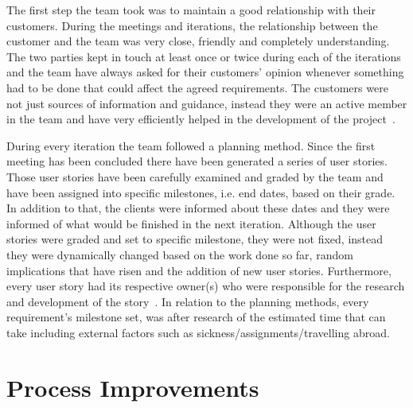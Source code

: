 \documentclass{l3proj}
\begin{document}
The first step the team took was to maintain a good relationship with their customers. During the meetings and iterations, the relationship between the customer and the team was very close, friendly and completely understanding. The two parties kept in touch at least once or twice during each of the iterations and the team have always asked for their customers' opinion whenever something had to be done that could affect the agreed requirements. The customers were not just sources of information and guidance, instead they were an active member in the team and have very efficiently helped in the development of the project~\cite{Customers}.

During every iteration the team followed a planning method. Since the first meeting has been concluded there have been generated a series of user stories. Those user stories have been carefully examined and graded by the team and have been assigned into specific milestones, i.e. end dates, based on their grade. In addition to that, the clients were informed about these dates and they were informed of what would be finished in the next iteration. Although the user stories were graded and set to specific milestone, they were not fixed, instead they were dynamically changed based on the work done so far, random implications that have risen and the addition of new user stories. Furthermore, every user story had its respective owner(s) who were responsible for the research and development of the story~\cite{UserStories}. In relation to the planning methods, every requirement's milestone set, was after research of the estimated time that can take including external factors such as sickness/assignments/travelling abroad.


\section{Process Improvements}
\label{sec:process-improvements}

\end{document}
